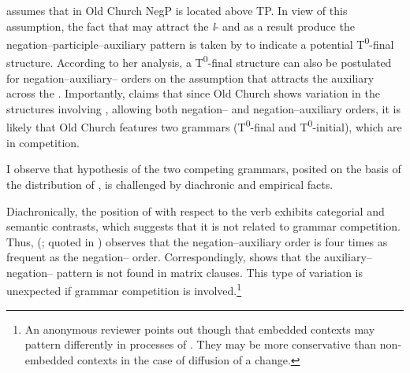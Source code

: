\documentclass[output=paper,modfonts,newtxmath,hidelinks]{langscibook}
\begin{document}
\ea \label{11:ex22}
	\label{11:ex22a}
	\label{11:ex22b}
	\label{11:ex22c}
	\z
\z
\citeauthor{pancheva2008} assumes that in Old Church  NegP is located above TP. In view of this assumption, the fact that  may attract the \textit{l}{}- and as a result produce the negation--participle--auxiliary pattern is taken by \citeauthor{pancheva2008} to indicate a potential T\textsuperscript{0}{}-final structure. According to her analysis, a T\textsuperscript{0}{}-final structure can also be postulated for negation--auxiliary-- orders on the assumption that  attracts the auxiliary across the . Importantly, \citeauthor{pancheva2008} claims that since Old Church  shows variation in the  structures involving , allowing both negation-- and negation--auxiliary orders, it is likely that Old Church  features two grammars (T\textsuperscript{0}{}-final and T\textsuperscript{0}{}-initial), which are in competition.

I observe that  hypothesis of the two competing grammars, posited on the basis of the distribution of , is challenged by diachronic and empirical facts. 

Diachronically, the position of  with respect to the verb exhibits categorial and semantic contrasts, which suggests that it is not related to grammar competition. Thus, \citeauthor{vecerka1989} (\citeyear[34]{vecerka1989}; quoted in \citealt[328]{willis2000}) observes that the negation--auxiliary order is four times as frequent as the negation-- order. Correspondingly, \citet[329]{willis2000} shows that the auxiliary--negation-- pattern is not found in matrix clauses. This type of variation is unexpected if grammar competition is involved.\footnote{\label{11:fn4}An anonymous reviewer points out though that embedded contexts may pattern differently in processes of . They may be more conservative than non-embedded contexts in the case of diffusion of a change.}
\end{document}
